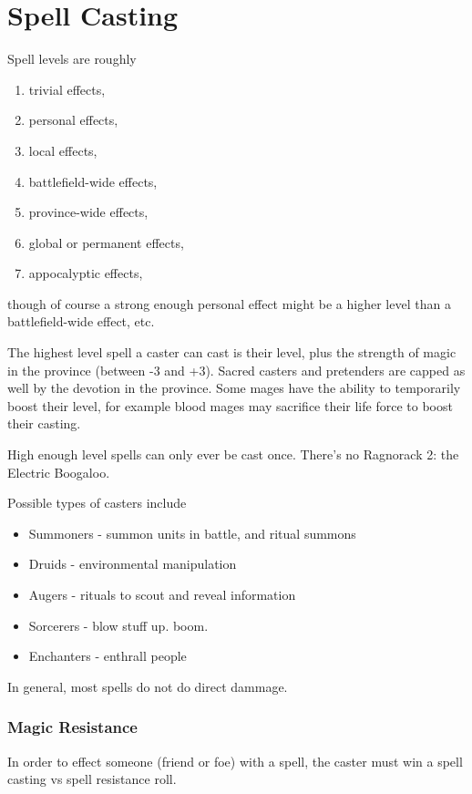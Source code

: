 \documentclass[12pt,letterpaper]{article}
\begin{document}
\section{Spell Casting}

Spell levels are roughly

\begin{enumerate}
	\item trivial effects,
	\item personal effects,
	\item local effects,
	\item battlefield-wide effects,
	\item province-wide effects,
	\item global or permanent effects,
	\item appocalyptic effects,
\end{enumerate}

though of course a strong enough personal effect
might be a higher level than a battlefield-wide effect, etc.

The highest level spell a caster can cast is
their level, plus the strength of magic in the province
(between -3 and +3).
Sacred casters and pretenders are capped as well by the devotion in the province.
Some mages have the ability to temporarily boost their level,
for example blood mages may sacrifice their life force to boost their casting.

High enough level spells can only ever be cast once.
There's no Ragnorack 2: the Electric Boogaloo.

Possible types of casters include
\begin{itemize}
	\item Summoners - summon units in battle, and ritual summons
	\item Druids - environmental manipulation
	\item Augers - rituals to scout and reveal information
	\item Sorcerers - blow stuff up. boom.
	\item Enchanters - enthrall people
\end{itemize}
In general, most spells do not do direct dammage.

\subsubsection{Magic Resistance}
In order to effect someone (friend or foe) with a spell,
the caster must win a spell casting vs spell resistance roll.
\end{document}
